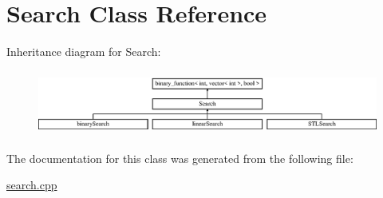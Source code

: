 \hypertarget{class_search}{\section{Search Class Reference}
\label{class_search}
}
Inheritance diagram for Search\-:\begin{figure}[H]
\begin{center}
\leavevmode
\includegraphics[height=2.153846cm]{class_search}
\end{center}
\end{figure}


The documentation for this class was generated from the following file\-:\begin{DoxyCompactItemize}
\item 
\hyperlink{search_8cpp}{search.\-cpp}\end{DoxyCompactItemize}
